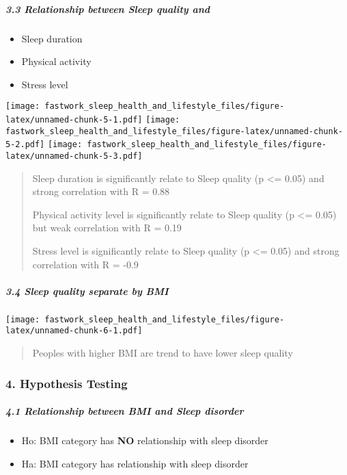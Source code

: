 \documentclass[
]{article}
\providecommand{\tightlist}{%
  \setlength{\itemsep}{0pt}\setlength{\parskip}{0pt}}
\begin{document}
\hypertarget{relationship-between-sleep-quality-and}{%
\subparagraph{3.3 Relationship between Sleep quality
and}\label{relationship-between-sleep-quality-and}}

\begin{itemize}
\tightlist
\item
  Sleep duration
\item
  Physical activity
\item
  Stress level
\end{itemize}

\texttt{[image: fastwork\_sleep\_health\_and\_lifestyle\_files/figure-latex/unnamed-chunk-5-1.pdf]}
\texttt{[image: fastwork\_sleep\_health\_and\_lifestyle\_files/figure-latex/unnamed-chunk-5-2.pdf]}
\texttt{[image: fastwork\_sleep\_health\_and\_lifestyle\_files/figure-latex/unnamed-chunk-5-3.pdf]}

\begin{quote}
Sleep duration is significantly relate to Sleep quality (p \textless=
0.05) and strong correlation with R = 0.88

Physical activity level is significantly relate to Sleep quality (p
\textless= 0.05) but weak correlation with R = 0.19

Stress level is significantly relate to Sleep quality (p \textless=
0.05) and strong correlation with R = -0.9
\end{quote}

\hypertarget{sleep-quality-separate-by-bmi}{%
\subparagraph{3.4 Sleep quality separate by
BMI}\label{sleep-quality-separate-by-bmi}}

\texttt{[image: fastwork\_sleep\_health\_and\_lifestyle\_files/figure-latex/unnamed-chunk-6-1.pdf]}

\begin{quote}
Peoples with higher BMI are trend to have lower sleep quality
\end{quote}

\hypertarget{hypothesis-testing}{%
\subsubsection{\texorpdfstring{\textbf{4. Hypothesis
Testing}}{4. Hypothesis Testing}}\label{hypothesis-testing}}

\hypertarget{relationship-between-bmi-and-sleep-disorder}{%
\subparagraph{4.1 Relationship between BMI and Sleep
disorder}\label{relationship-between-bmi-and-sleep-disorder}}

\begin{itemize}
\tightlist
\item
  Ho: BMI category has \textbf{NO} relationship with sleep disorder
\item
  Ha: BMI category has relationship with sleep disorder
\end{itemize}
\end{document}
